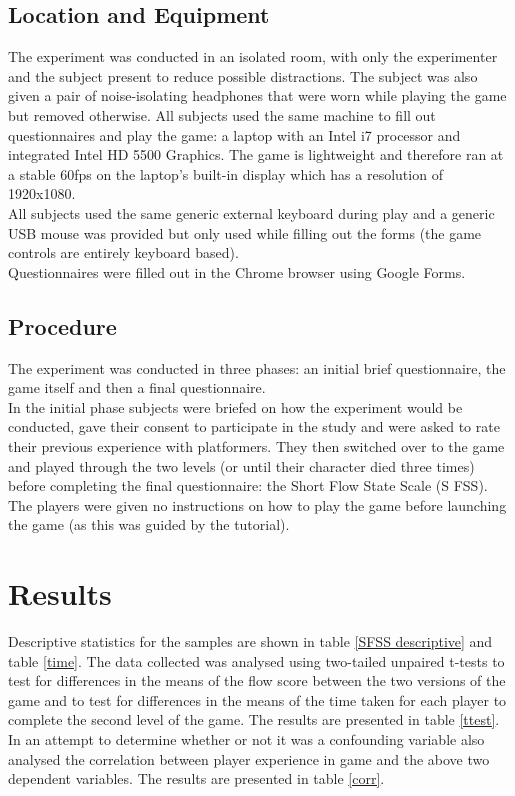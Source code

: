 \documentclass{acmsiggraph}
\begin{document}
\subsection{Location and Equipment}
The experiment was conducted in an isolated room, with only the experimenter and the subject present to reduce possible distractions.
The subject was also given a pair of noise-isolating headphones that were worn while playing the game but removed otherwise.
All subjects used the same machine to fill out questionnaires and play the game: a laptop with an Intel i7 processor and integrated Intel HD 5500 Graphics. The game is lightweight and therefore ran at a stable 60fps on the laptop's built-in display which has a resolution of 1920x1080.\\
All subjects used the same generic external keyboard during play and a generic USB mouse was provided but only used while filling out the forms (the game controls are entirely keyboard based). \\
Questionnaires were filled out in the Chrome browser using Google Forms.  

\subsection{Procedure}
The experiment was conducted in three phases: an initial brief questionnaire, the game itself and then a final questionnaire.\\
In the initial phase subjects were briefed on how the experiment would be conducted, gave their consent to participate in the study and were asked to rate their previous experience with platformers. They then switched over to the game and played through the two levels (or until their character died three times) before completing the final questionnaire: the Short Flow State Scale (S FSS)\cite{jackson}.\\
The players were given no instructions on how to play the game before launching the game (as this was guided by the tutorial).

\section{Results}

Descriptive statistics for the samples are shown in table \ref{SFSS descriptive} and table \ref{time}. The data collected was analysed using two-tailed unpaired t-tests to test for differences in the means of the flow score between the two versions of the game and to test for differences in the means of the time taken for each player to complete the second level of the game. The results are presented in table \ref{ttest}. In an attempt to determine whether or not it was a confounding variable also analysed the correlation between player experience in game and the above two dependent variables. The results are presented in table \ref{corr}.
\\
\end{document}

